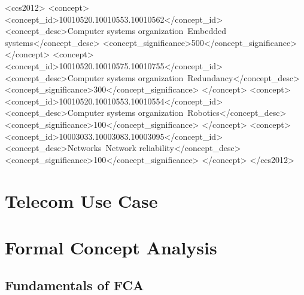 \documentclass[acmconf,authordraft]{acmart}
\begin{document}
\begin{CCSXML}
<ccs2012>
 <concept>
  <concept_id>10010520.10010553.10010562</concept_id>
  <concept_desc>Computer systems organization~Embedded systems</concept_desc>
  <concept_significance>500</concept_significance>
 </concept>
 <concept>
  <concept_id>10010520.10010575.10010755</concept_id>
  <concept_desc>Computer systems organization~Redundancy</concept_desc>
  <concept_significance>300</concept_significance>
 </concept>
 <concept>
  <concept_id>10010520.10010553.10010554</concept_id>
  <concept_desc>Computer systems organization~Robotics</concept_desc>
  <concept_significance>100</concept_significance>
 </concept>
 <concept>
  <concept_id>10003033.10003083.10003095</concept_id>
  <concept_desc>Networks~Network reliability</concept_desc>
  <concept_significance>100</concept_significance>
 </concept>
</ccs2012>
\end{CCSXML}





\maketitle

\section{Telecom Use Case}

\section{Formal Concept Analysis}
\subsection{Fundamentals of FCA}
\end{document}
